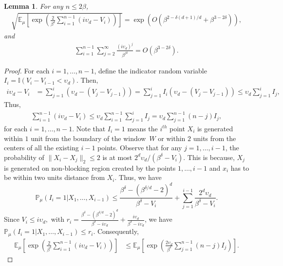\documentclass[pdflatex, sn-mathphys-ay]{sn-jnl}%
\newcommand{\ind}{\mathbb{I}}
\newcommand{\pp}{\mathbb{P}}
\newcommand{\ee}{\mathbb{E}}
\newcommand{\lt}{\left}
\newcommand{\rt}{\right}
\newtheorem{lemma}{Lemma}
\theoremstyle{thmstyleone}%
\theoremstyle{thmstyletwo}%
\theoremstyle{thmstylethree}%
\begin{document}
\begin{appendices}
\begin{lemma}
    \label{lem:upper-bound-ELX}
    For any $n \leq 2\beta$, 
    \begin{align}
    \sqrt{\ee_\mu\lt[\exp\lt(\frac{2}{\beta^{\delta}}  \sum_{i =1}^{n-1} (i\upsilon_d - V_i)\rt)\rt]} = \exp\lt( O\lt(\beta^{2 -{\delta(d+1)/d}} + \beta^{3 - 2\delta} \rt)\rt),
    \label{eqn:part1-of-lemma}
\end{align}
and 
\begin{align}
 \sum_{i = 1}^{n -1} \sum_{j = 2}^\infty\frac{(i\upsilon_d)^j}{\beta^{j\delta}} = O( \beta^{3 - 2\delta}). 
\label{eqn:part2-of-lemma}
\end{align}
\end{lemma}
\begin{proof}
For each $i = 1, \dots, n-1$, define the indicator random variable
$I_i = \ind( V_{i} - V_{i-1} < \upsilon_d)$.
Then, 
\begin{align}
i\upsilon_d - V_{i} &= \sum_{j = 1}^{i} \lt(\upsilon_d - (V_{j} - V_{j-1}) \rt) =  \sum_{j =1}^i I_i\lt(\upsilon_d - (V_{j} - V_{j-1}) \rt) 
\leq {  \upsilon_d \sum_{j =1}^i I_j,}
\label{eqn:low_bdd_Bi}
\end{align}
Thus, 
\begin{align*}
\sum_{i =1}^{n-1} (i\upsilon_d - V_i) \leq \upsilon_d \sum_{i = 1}^{n-1} \sum_{j = 1}^i I_j = \upsilon_d \sum_{j = 1}^{n-1} (n - j) I_j,
\end{align*}
for each $i = 1,\dots, n-1$.
Note that $I_i = 1$ means the $i^{th}$ point $X_i$ is generated within $1$ unit from the boundary of the window~$W$ or within $2$ units from the centers of all the existing $i-1$ points. {  Observe that  for any $j =1, \dots, i-1$, the probability of $\|X_i - X_j\|_2 \leq 2$ is at most $2^d \upsilon_d/(\beta^{\delta} - V_i)$. This is because, $X_j$ is generated on non-blocking region created by the points $1, \dots, i-1$ and $x_i$ has to be within two units distance from $X_i$.} Thus, we have
\[
\pp_\mu \lt( I_i = 1 | X_1,\dots, X_{i-1}\rt) \leq 
\frac{\beta^{\delta} - (\beta^{\delta/d} - 2)^d}{\beta^{\delta} - V_i} + \sum_{j = 1}^{i-1} \frac{2^d \upsilon_d}{\beta^{\delta} - V_i}.
\]
Since $V_i \leq i \upsilon_d,$ with $r_i =  \frac{\beta^{\delta} - (\beta^{{\delta/d} } -2)^d}{\beta^{\delta} - i\upsilon_d} + \frac{i \upsilon_d}{\beta^{\delta} - i \upsilon_d}$, we have 
$\pp_\mu\lt( I_i = 1| X_1,\dots, X_{i-1}\rt) \leq r_i.$
Consequently,
\begin{align*}
\ee_\mu\lt[\exp\lt(\frac{2}{\beta^{\delta}}  \sum_{i =1}^{n-1} (i\upsilon_d - V_i)\rt)\rt] &\leq \ee_\mu\lt[\exp\lt(\frac{2 \upsilon_d}{\beta^{\delta}} \sum_{j = 1}^{n-1} (n - j) I_j \rt)\rt].

\end{align*}
\end{proof}
\end{appendices}
\end{document}
